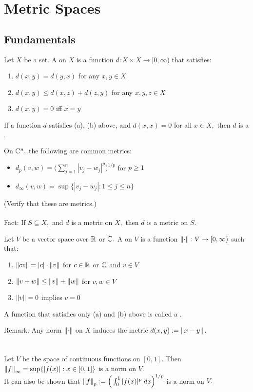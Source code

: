 \chapter{Metric Spaces}
\section{Fundamentals}
\begin{defn}
Let $X$ be a set. A  on $X$ is a function $d:X\times X\rightarrow [0,\infty)$ that satisfies: 
\begin{enumerate}
\item[(a)] $d(x,y)=d(y,x)$ for any $x,y\in X$
\item[(b)] $d(x,y)\leq d(x,z)+d(z,y)$ for any $x,y,z\in X$
\item[(c)] $d(x,y)=0$ iff $x=y$
\end{enumerate}
If a function $d$ satisfies (a), (b) above, and $d(x,x)=0$ for all $x\in X,$ then $d$ is a .
\end{defn}

\Ex On $\mathbb{C}^{n},$ the following are common metrics:
\begin{itemize}
\item $d_p(v,w)=\Big(\sum\limits_{j=1}^n |v_j-w_j|^p\Big)^{1/p}$ for $p\geq 1$
\item $d_{\infty}(v,w)=\sup\{|v_j-w_j|:1\leq j\leq n\}$
\end{itemize}
(Verify that these are metrics.) \\ \\
Fact: If $S\subseteq X,$ and $d$ is a metric on $X,$ then $d$ is a metric on $S.$ \\

\begin{defn} 
Let $V$ be a vector space over $\mathbb{R}^{ }$ or $\mathbb{C}^{ }.$ A  on $V$ is a function $\left\lVert\cdot\right\rVert:V\rightarrow[0,\infty)$ such that:
\begin{enumerate}
\item[(a)] $\left\lVert cv\right\rVert=|c|\cdot\left\lVert v\right\rVert$ for $c\in \mathbb{R}^{}$ or $\mathbb{C}^{}$ and $v\in V$
\item[(b)] $\left\lVert v+w\right\rVert\leq\left\lVert v\right\rVert+\left\lVert w\right\rVert$ for $v,w\in V$
\item[(c)] $\left\lVert v\right\rVert=0$ implies $v=0$
\end{enumerate}
A function that satisfies only (a) and (b) above is called a .
\end{defn}

\noindent Remark: Any norm $\left\lVert\cdot\right\rVert$ on $X$ induces the metric $d(x,y):=\left\lVert x-y\right\rVert.$ \\ \\ \\
\Ex Let $V$ be the space of continuous functions on $[0,1].$ Then  \\ $\left\lVert f\right\rVert_{\infty}=\sup\{|f(x)|:x\in[0,1]\}$ is a norm on $V.$ \\
It can also be shown that $\left\lVert f\right\rVert_p:=\Big(\int_0^1 |f(x)|^p\;dx\Big)^{1/p}$ is a norm on $V.$ \\

